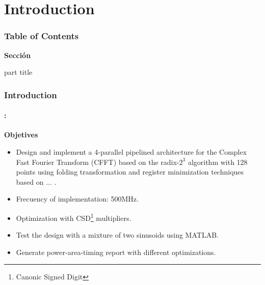 

\section{Introduction}
\begin{frame}
  \frametitle{\textbf{Table of Contents}}
  \begin{center}
    {\vspace{-1.5cm}\Large \textbf{Sección \thesection}\vspace{0.5cm}}
    \begin{beamercolorbox}[
      sep=8pt,center]{part title}
      \textbf{\insertsection}
    \end{beamercolorbox}
  \end{center}
\end{frame}


\begin{frame}
	\frametitle{\textbf{Introduction}}
	\framesubtitle{\secname : \subsecname}
	\begin{block}{\centering \textbf{Objetives}}
		\begin{itemize} \justifying\footnotesize
  			\item Design and implement a 4-parallel pipelined architecture for the Complex Fast Fourier Transform (CFFT) based on the radix-$2^3$ algorithm with 128 points 	using folding transformation and register minimization techniques based on ... .
   			\item Frecuency of implementation: 500MHz. 
  			\item Optimization with CSD\footnote{Canonic Signed Digit} multipliers.
  			\item Test the design with a mixture of two sinusoids using MATLAB.
  			\item Generate power-area-timing report with different
			optimizations. 			
  		\end{itemize}
    \end{block}
\end{frame}



